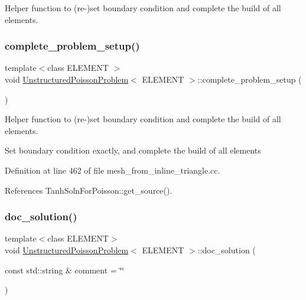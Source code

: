 Helper function to (re-\/)set boundary condition and complete the build of all elements. 

\mbox{\label{classUnstructuredPoissonProblem_a5cbf00790e8469b43c64c6aaadfe7b41}} 
\subsubsection{\texorpdfstring{complete\+\_\+problem\+\_\+setup()}{complete\_problem\_setup()}\hspace{0.1cm}{\footnotesize\ttfamily [2/2]}}
{\footnotesize\ttfamily template$<$class E\+L\+E\+M\+E\+NT $>$ \\
void \hyperlink{classUnstructuredPoissonProblem}{Unstructured\+Poisson\+Problem}$<$ E\+L\+E\+M\+E\+NT $>$\+::complete\+\_\+problem\+\_\+setup (\begin{DoxyParamCaption}{ }\end{DoxyParamCaption})\hspace{0.3cm}{\ttfamily [private]}}



Helper function to (re-\/)set boundary condition and complete the build of all elements. 

Set boundary condition exactly, and complete the build of all elements 

Definition at line 462 of file mesh\+\_\+from\+\_\+inline\+\_\+triangle.\+cc.



References Tanh\+Soln\+For\+Poisson\+::get\+\_\+source().

\mbox{\label{classUnstructuredPoissonProblem_a9b21a3c3f574da71411f852006fe2a0c}} 
\subsubsection{\texorpdfstring{doc\+\_\+solution()}{doc\_solution()}\hspace{0.1cm}{\footnotesize\ttfamily [1/2]}}
{\footnotesize\ttfamily template$<$class E\+L\+E\+M\+E\+NT$>$ \\
void \hyperlink{classUnstructuredPoissonProblem}{Unstructured\+Poisson\+Problem}$<$ E\+L\+E\+M\+E\+NT $>$\+::doc\+\_\+solution (\begin{DoxyParamCaption}\item[{const std\+::string \&}]{comment = {\ttfamily \char`\"{}\char`\"{}} }\end{DoxyParamCaption})}



